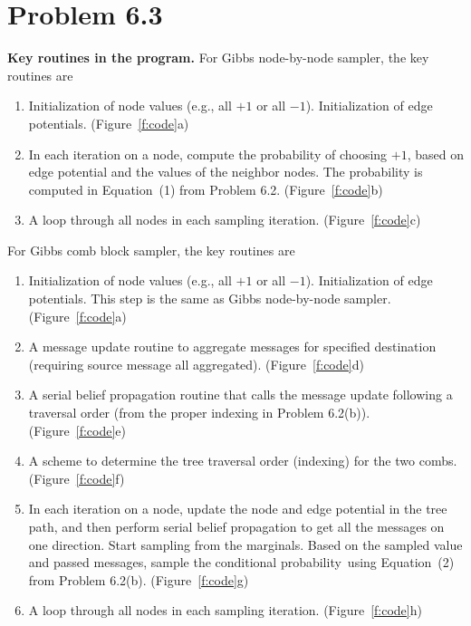 \documentclass{article}
\begin{document}
\section*{Problem 6.3}
%
\textbf{Key routines in the program.}
%
\noindent
For Gibbs node-by-node sampler, the key routines are 
\begin{enumerate}
	\item Initialization of node values (e.g., all $+1$ or all $-1$). Initialization of edge potentials. (Figure~\ref{f:code}a)
	\item In each iteration on a node, compute the probability of choosing $+1$, based on edge potential
	  	  and the values of the neighbor nodes. The probability is computed
	  	  in Equation~(1) from Problem 6.2. (Figure~\ref{f:code}b)
	\item A loop through all nodes in each sampling iteration. (Figure~\ref{f:code}c)
\end{enumerate}
%
For Gibbs comb block sampler, the key routines are
\begin{enumerate}
	\item Initialization of node values (e.g., all $+1$ or all $-1$). Initialization of edge potentials. This
	      step is the same as Gibbs node-by-node sampler. (Figure~\ref{f:code}a)
	\item A message update routine to aggregate messages for specified destination (requiring source message all aggregated). 
	      (Figure~\ref{f:code}d)
	\item A serial belief propagation routine that calls the message update following a traversal order
	      (from the proper indexing in Problem 6.2(b)). (Figure~\ref{f:code}e)
	\item A scheme to determine the tree traversal order (indexing) for the two combs. (Figure~\ref{f:code}f)
	\item In each iteration on a node, update the node and edge potential in the tree path, and then
	      perform serial belief propagation to get all the messages on one direction.
	      Start sampling from the marginals. Based on the sampled value and passed messages,
	      sample the conditional probability using Equation~(2) from Problem 6.2(b). (Figure~\ref{f:code}g)
	\item A loop through all nodes in each sampling iteration. (Figure~\ref{f:code}h)
\end{enumerate}
\end{document}
